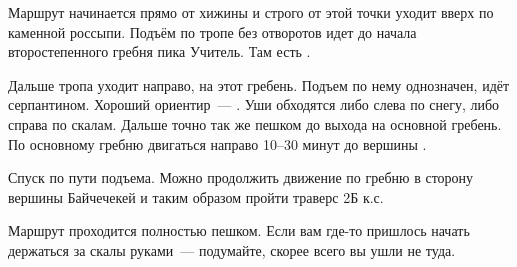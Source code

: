 Маршрут начинается прямо от хижины \geoLighthouse и строго от этой
точки уходит вверх по каменной россыпи. Подъём по тропе без отворотов
идет до начала второстепенного гребня пика Учитель. Там есть
.

Дальше тропа уходит направо, на этот гребень. Подъем по нему
однозначен, идёт серпантином. Хороший ориентир~--- \geoUchitelUshi.
Уши обходятся либо слева по снегу, либо справа по скалам. Дальше точно
так же пешком до выхода на основной гребень. По основному гребню
двигаться направо 10--30 минут до вершины \geoPeakUchitel.

Спуск по пути подъема. Можно продолжить движение по гребню в сторону
вершины Байчечекей и таким образом пройти траверс 2Б к.с.

Маршрут проходится полностью пешком. Если вам где-то пришлось начать
держаться за скалы руками~--- подумайте, скорее всего вы ушли не туда.
